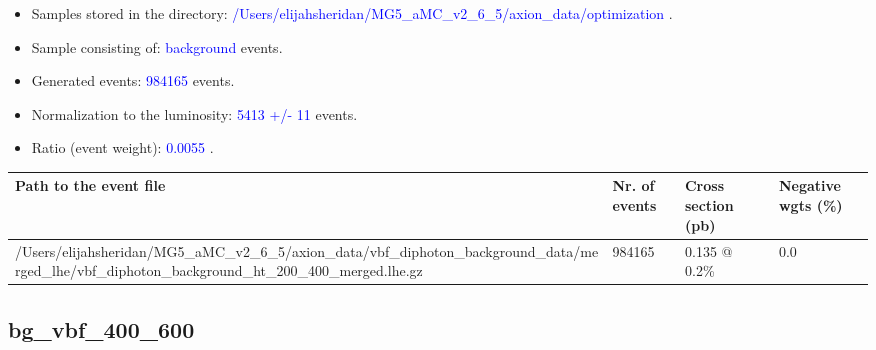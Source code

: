 \documentclass[a4paper, 10pt]{article}
\begin{document}
\begin{itemize}
  \item Samples stored in the directory: \textcolor{blue}{/\-Users/\-elijahsheridan/\-MG5\_aMC\_v2\_6\_5/\-axion\_data/\-optimization} .
   \item Sample consisting of: \textcolor{blue}{background}  events.
   \item Generated events: \textcolor{blue}{984165 }  events.
   \item Normalization to the luminosity: \textcolor{blue}{5413}\textcolor{blue}{ +/\-- }\textcolor{blue}{11 }  events.
   \item Ratio (event weight): \textcolor{blue}{0.0055 } .  
 
\end{itemize}
\begin{table}[H]
  \begin{center}
    \begin{tabular}{|m{55.0mm}|m{25.0mm}|m{30.0mm}|m{30.0mm}|}
      \hline
      {\cellcolor{yellow}         Path to the event file}& {\cellcolor{yellow}         Nr. of events}& {\cellcolor{yellow}         Cross section (pb)}& {\cellcolor{yellow}         Negative wgts (\%)}\\
      \hline
      {\cellcolor{white}          /\-Users/\-elijahsheridan/\-MG5\_aMC\_v2\_6\_5/\-axion\_data/\-vbf\_diphoton\_background\_data/\-merged\_lhe/\-vbf\_diphoton\_background\_ht\_200\_400\_merged.lhe.gz}& {\cellcolor{white}          984165}& {\cellcolor{white}          0.135 @ 0.2\%}& {\cellcolor{white}          0.0}\\
\hline
    \end{tabular}
  \end{center}
\end{table}

\subsection{ bg\_vbf\_400\_600}
\end{document}
